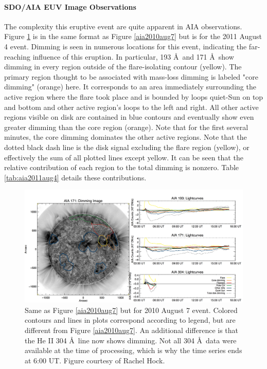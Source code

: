 \paragraph{SDO/AIA EUV Image Observations}
The complexity this eruptive event are quite apparent in AIA observations. Figure \ref{aia2011aug4} is in the same format as Figure \ref{aia2010aug7} but is for the 2011 August 4 event. Dimming is seen in numerous locations for this event, indicating the far-reaching influence of this eruption. In particular, 193 \AA\ and 171 \AA\ show dimming in every region outside of the flare-isolating contour (yellow). The primary region thought to be associated with mass-loss dimming is labeled "core dimming" (orange) here. It corresponds to an area immediately surrounding the active region where the flare took place and is bounded by loops quiet-Sun on top and bottom and other active region's loops to the left and right. All other active regions visible on disk are contained in blue contours and eventually show even greater dimming than the core region (orange). Note that for the first several minutes, the core dimming dominates the other active regions. Note that the dotted black dash line is the disk signal excluding the flare region (yellow), or effectively the sum of all plotted lines except yellow. It can be seen that the relative contribution of each region to the total dimming is nonzero. Table \ref{tab:aia2011aug4} details these contributions. 

\begin{figure}[!h]
    \begin{center}
	    \includegraphics[width=166mm]{Images/Aia2011Aug4.png}
    \end{center}
    \caption[AIA contour analysis for 2011 August 4 event]{
        Same as Figure \ref{aia2010aug7} but for 2010 August 7 event. Colored contours and lines in plots correspond 
        according to legend, but are different from Figure \ref{aia2010aug7}. An additional difference is that the He II
        304 \AA\ line now shows dimming. Not all 304 \AA\ data were available at the time of processing, which is why the 
        time series ends at 6:00 UT. Figure courtesy of Rachel Hock. 
	}
    \label{aia2011aug4}
\end{figure}

